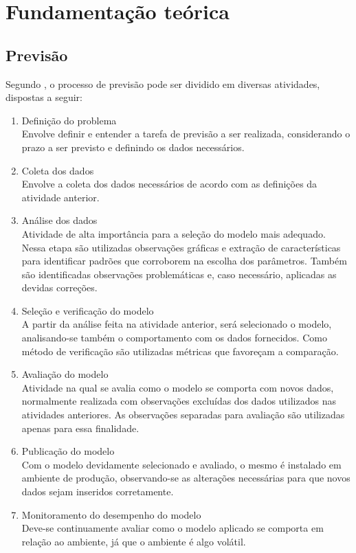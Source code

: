 \documentclass[
    12pt,
    oneside,
    a4paper,
    english,
    brazil
]{abntex2}
\begin{document}
\chapter{Fundamentação teórica}\label{chap:fundTeor}

\section{Previsão}
Segundo , o processo de previsão pode ser dividido em diversas atividades, dispostas a seguir:

\begin{enumerate}
    \item Definição do problema\\
        Envolve definir e entender a tarefa de previsão a ser realizada,
        considerando o prazo a ser previsto e definindo os dados necessários.
    \item Coleta dos dados\\
        Envolve a coleta dos dados necessários de acordo com as definições da atividade anterior.
    \item Análise dos dados\\
        Atividade de alta importância para a seleção do modelo mais adequado. Nessa etapa são utilizadas observações gráficas e extração de
        características para identificar padrões que corroborem na escolha dos
        parâmetros. Também são identificadas observações problemáticas e, caso necessário, aplicadas as devidas correções.
    \item Seleção e verificação do modelo\\
        A partir da análise feita na atividade anterior, será selecionado o modelo, analisando-se também o
        comportamento com os dados fornecidos. Como método de verificação são utilizadas métricas que favoreçam a comparação.
    \item Avaliação do modelo\\
        Atividade na qual se avalia como o modelo se comporta com novos dados, normalmente realizada com observações excluídas dos dados utilizados nas atividades anteriores. As observações separadas para avaliação são utilizadas apenas para essa finalidade.
    \item Publicação do modelo\\
        Com o modelo devidamente selecionado e avaliado, o mesmo é instalado em ambiente de produção, observando-se as alterações necessárias para que novos dados sejam inseridos corretamente.
    \item Monitoramento do desempenho do modelo\\
        Deve-se continuamente avaliar como o modelo aplicado se comporta em relação ao ambiente, já que o ambiente é algo volátil.
\end{enumerate}
\end{document}
